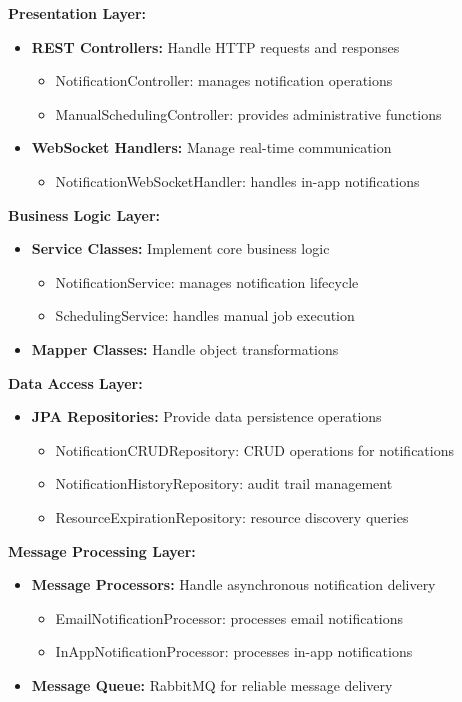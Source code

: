 \textbf{Presentation Layer:}
\begin{itemize}
    \item \textbf{REST Controllers:} Handle HTTP requests and responses
        \begin{itemize}
            \item NotificationController: manages notification operations
            \item ManualSchedulingController: provides administrative functions
        \end{itemize}
    \item \textbf{WebSocket Handlers:} Manage real-time communication
        \begin{itemize}
            \item NotificationWebSocketHandler: handles in-app notifications
        \end{itemize}
\end{itemize}

\noindent
\textbf{Business Logic Layer:}
\begin{itemize}
    \item \textbf{Service Classes:} Implement core business logic
        \begin{itemize}
            \item NotificationService: manages notification lifecycle
            \item SchedulingService: handles manual job execution
        \end{itemize}
    \item \textbf{Mapper Classes:} Handle object transformations
\end{itemize}

\noindent
\textbf{Data Access Layer:}
\begin{itemize}
    \item \textbf{JPA Repositories:} Provide data persistence operations
        \begin{itemize}
            \item NotificationCRUDRepository: CRUD operations for notifications
            \item NotificationHistoryRepository: audit trail management
            \item ResourceExpirationRepository: resource discovery queries
        \end{itemize}
\end{itemize}

\noindent
\textbf{Message Processing Layer:}
\begin{itemize}
    \item \textbf{Message Processors:} Handle asynchronous notification delivery
        \begin{itemize}
            \item EmailNotificationProcessor: processes email notifications
            \item InAppNotificationProcessor: processes in-app notifications
        \end{itemize}
    \item \textbf{Message Queue:} RabbitMQ for reliable message delivery
\end{itemize}

